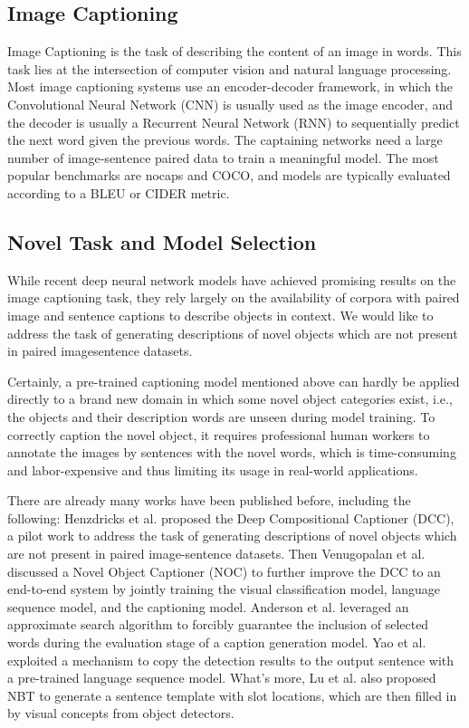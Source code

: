 \documentclass[a4paper, 11pt]{article} %
\begin{document}
\subsection{\textbf{Image Captioning}}

Image Captioning is the task of describing the content of an image in words. This task lies
at the intersection of computer vision and natural language processing. Most image captioning
systems use an encoder-decoder framework, in which the Convolutional Neural Network (CNN)
is usually used as the image encoder, and the decoder is usually a Recurrent Neural Network
(RNN) to sequentially predict the next word given the previous words. The captaining networks
need a large number of image-sentence paired data to train a meaningful model. The most
popular benchmarks are nocaps and COCO, and models are typically evaluated according to a
BLEU or CIDER metric.

\subsection{\textbf{Novel Task and Model Selection}}

While recent deep neural network models have achieved promising results on the image
captioning task, they rely largely on the availability of corpora with paired image and
sentence captions to describe objects in context. We would like to address the task of
generating descriptions of novel objects which are not present in paired imagesentence
datasets.

Certainly, a pre-trained captioning model mentioned above can hardly be applied directly to
a brand new domain in which some novel object categories exist, i.e., the objects and their
description words are unseen during model training. To correctly caption the novel object,
it requires professional human workers to annotate the images by sentences with the novel
words, which is time-consuming and labor-expensive and thus limiting its usage in real-world
applications.

There are already many works have been published before, including the following: Henzdricks
et al. proposed the Deep Compositional Captioner (DCC), a pilot work to address the task
of generating descriptions of novel objects which are not present in paired image-sentence
datasets. Then Venugopalan et al. discussed a Novel Object Captioner (NOC) to further improve
the DCC to an end-to-end system by jointly training the visual classification model, language
sequence model, and the captioning model. Anderson et al. leveraged an approximate search
algorithm to forcibly guarantee the inclusion of selected words during the evaluation stage
of a caption generation model. Yao et al. exploited a mechanism to copy the detection results
to the output sentence with a pre-trained language sequence model. What's more, Lu et al.
also proposed NBT to generate a sentence template with slot locations, which are then filled
in by visual concepts from object detectors.
\end{document}

